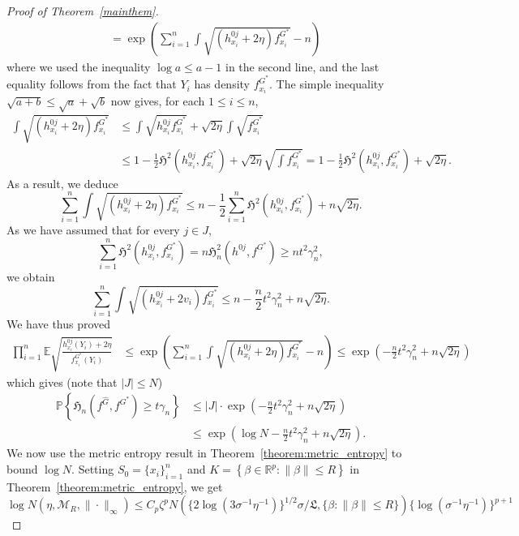 \documentclass[11pt]{article}
\numberwithin{equation}{section}
\newcommand{\Y}{Y}
\newcommand{\Expt}{\mathbb{E}} %
\newcommand{\lipsz}{\mathfrak{L}}
\newcommand{\PP}{\mathbb{P}}
\begin{document}
\begin{appendices}
\begin{proof}[Proof of Theorem~\ref{mainthem}]
\[\begin{split}
& = \exp\left(\sum_{i=1}^n \int \sqrt{(h^{0j}_{x_i} + 2\eta) f^{G^*}_{x_i}} - n \right)
\end{split}
\]
where we used the inequality $\log a \leq a -1$ in the second line, and the last equality follows from the fact that $Y_i$ has density $f_{x_i}^{G^*}$. The simple inequality $\sqrt{a+b} \leq \sqrt{a} + \sqrt{b}$ now gives, for each $1 \le i \le n$, 
\[
\begin{split}
\int \sqrt{(h^{0j}_{x_i}+2\eta) f^{G^*}_{x_i}} &\leq 
\int \sqrt{h^{0j}_{x_i} f^{G^*}_{x_i}}+ \sqrt{2 \eta} \int \sqrt{f^{G^*}_{x_i}} \\
&\leq 1 - \frac{1}{2} \mathfrak{H}^2(h^{0j}_{x_i}, f^{G^*}_{x_i}) + \sqrt{2 \eta} \sqrt{\int f^{G^*}_{x_i}} = 1 - \frac{1}{2} \mathfrak{H}^2(h^{0j}_{x_i}, f^{G^*}_{x_i}) + \sqrt{2 \eta}. 
\end{split}
\]
As a result, we deduce
\[
\sum_{i=1}^n \int \sqrt{(h^{0j}_{x_i}+2 \eta ) f^{G^*}_{x_i}} \leq n - \frac{1}{2} \sum_{i=1}^n \mathfrak{H}^2(h^{0j}_{x_i}, f^{G^*}_{x_i})+ n \sqrt{2  \eta} .
\]
As we have assumed that for every $j \in J$, 
\[
\sum_{i=1}^n \mathfrak{H}^2(h^{0j}_{x_i}, f^{G^*}_{x_i}) = n \mathfrak{H}^2_n(h^{0j}, f^{G^*}) \geq n t^2 \gamma_n^2,
\]
we obtain
\[
\sum_{i=1}^n \int \sqrt{(h^{0j}_{x_i}+2v_i) f^{G^*}_{x_i}} \leq n - \frac{n}{2} t^2 \gamma_n^2+ n\sqrt{2\eta}.
\]
We have thus proved
\[
\begin{split}
\prod_{i=1}^n  \Expt \sqrt{ \frac{h^{0j}_{x_i}(\Y_i) + 2 \eta}{f^{G^*}_{x_i}(\Y_i)}} & \leq \exp\left(\sum_{i=1}^n \int \sqrt{(h^{0j}_{x_i} + 2\eta) f^{G^*}_{x_i}} - n \right) \leq \exp(- \frac{n}{2} t^2 \gamma_n^2+ n\sqrt{2\eta})
\end{split}
\]
which gives (note that $|J| \leq N$)
\begin{align}
\PP \left\{\mathfrak{H}_n(f^{\hat{G}}, f^{G^*}) \geq t \gamma_n \right\} 
&\leq  |J| \cdot \exp\left( - \frac{n}{2} t^2\gamma_n^2 + n \sqrt{2 \eta}\right) \nonumber \\
& \leq  \exp\left(\log N- \frac{n}{2} t^2\gamma_n^2 + n \sqrt{2 \eta}\right). \label{hellbound}
\end{align} 
We now use the metric entropy result in Theorem~\ref{theorem:metric_entropy} to bound $\log N$. Setting $S_0 = \{x_i\}_{i=1}^n$ and $K =  \left\{\beta \in \mathbb{R}^p : \|\beta\| \leq R \right\}$  in Theorem~\ref{theorem:metric_entropy}, we get 
\[
\log N(\eta, \mathcal{M}_R, \| \cdot \|_{\infty}) \leq C_p \zeta^p N(\{2 \log(3\sigma^{-1}\eta^{-1})\}^{1/2} \sigma/\lipsz,\{\beta : \|\beta\| \leq R \}) \{\log(\sigma^{-1}\eta^{-1})\}^{p+1}
\]
\end{proof}
\end{appendices}
\end{document}
